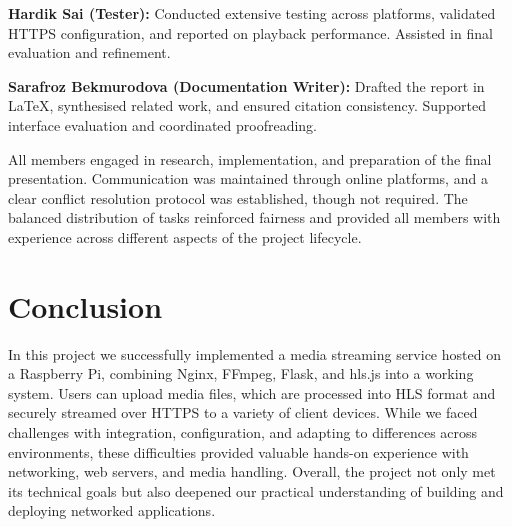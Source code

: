 \documentclass[11pt]{article}
\begin{document}
\textbf{Hardik Sai (Tester):} Conducted extensive testing across platforms, validated HTTPS configuration, and reported on playback performance. Assisted in final evaluation and refinement.

\textbf{Sarafroz Bekmurodova (Documentation Writer):} Drafted the report in LaTeX, synthesised related work, and ensured citation consistency. Supported interface evaluation and coordinated proofreading.

All members engaged in research, implementation, and preparation of the final presentation. Communication was maintained through online platforms, and a clear conflict resolution protocol was established, though not required. The balanced distribution of tasks reinforced fairness and provided all members with experience across different aspects of the project lifecycle.

\section{Conclusion}
In this project we successfully implemented a media streaming service hosted on a Raspberry Pi, combining Nginx, FFmpeg, Flask, and hls.js into a working system. Users can upload media files, which are processed into HLS format and securely streamed over HTTPS to a variety of client devices. While we faced challenges with integration, configuration, and adapting to differences across environments, these difficulties provided valuable hands-on experience with networking, web servers, and media handling. Overall, the project not only met its technical goals but also deepened our practical understanding of building and deploying networked applications.
\end{document}

